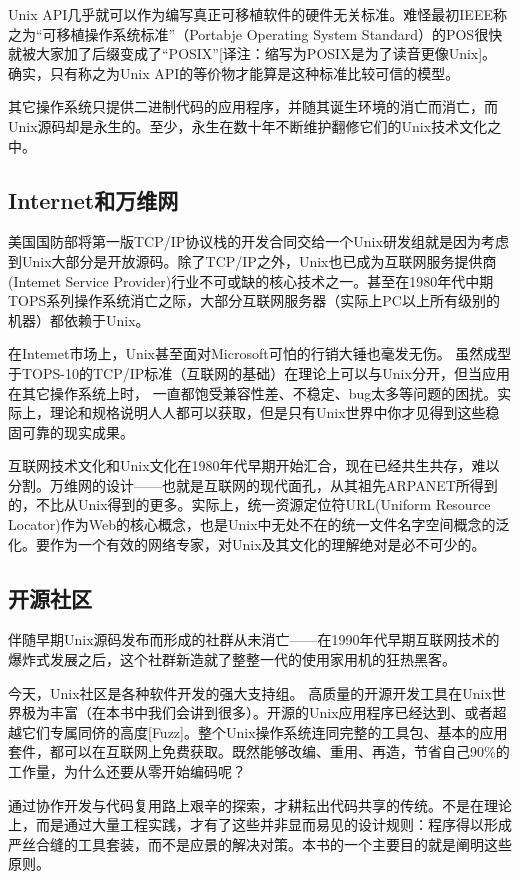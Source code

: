 \documentclass[12pt,oneside]{book}
\begin{document}
\begin{common-format}
Unix API几乎就可以作为编写真正可移植软件的硬件无关标准。难怪最初IEEE称之为“可移植操作系统标准”（Portabje Operating System Standard）的POS很快就被大家加了后缀变成了“POSIX”[译注：缩写为POSIX是为了读音更像Unix]。  确实，只有称之为Unix API的等价物才能算是这种标准比较可信的模型。

其它操作系统只提供二进制代码的应用程序，并随其诞生环境的消亡而消亡，而Unix源码却是永生的。至少，永生在数十年不断维护翻修它们的Unix技术文化之中。

\subsection{Internet和万维网}
美国国防部将第一版TCP/IP协议栈的开发合同交给一个Unix研发组就是因为考虑到Unix大部分是开放源码。除了TCP/IP之外，Unix也已成为互联网服务提供商(Intemet Service Provider)行业不可或缺的核心技术之一。甚至在1980年代中期TOPS系列操作系统消亡之际，大部分互联网服务器（实际上PC以上所有级别的机器）都依赖于Unix。

在Intemet市场上，Unix甚至面对Microsoft可怕的行销大锤也毫发无伤。  虽然成型于TOPS-10的TCP/IP标准（互联网的基础）在理论上可以与Unix分开，但当应用在其它操作系统上时，  一直都饱受兼容性差、不稳定、bug太多等问题的困扰。实际上，理论和规格说明人人都可以获取，但是只有Unix世界中你才见得到这些稳固可靠的现实成果。

互联网技术文化和Unix文化在1980年代早期开始汇合，现在已经共生共存，难以分割。万维网的设计——也就是互联网的现代面孔，从其祖先ARPANET所得到的，不比从Unix得到的更多。实际上，统一资源定位符URL(Uniform Resource Locator)作为Web的核心概念，也是Unix中无处不在的统一文件名字空间概念的泛化。要作为一个有效的网络专家，对Unix及其文化的理解绝对是必不可少的。

\subsection{开源社区}
伴随早期Unix源码发布而形成的社群从未消亡——在1990年代早期互联网技术的爆炸式发展之后，这个社群新造就了整整一代的使用家用机的狂热黑客。

今天，Unix社区是各种软件开发的强大支持组。  高质量的开源开发工具在Unix世界极为丰富（在本书中我们会讲到很多）。开源的Unix应用程序已经达到、或者超越它们专属同侪的高度[Fuzz]。整个Unix操作系统连同完整的工具包、基本的应用套件，都可以在互联网上免费获取。既然能够改编、重用、再造，节省自己90\%的工作量，为什么还要从零开始编码呢？

通过协作开发与代码复用路上艰辛的探索，才耕耘出代码共享的传统。不是在理论上，而是通过大量工程实践，才有了这些并非显而易见的设计规则：程序得以形成严丝合缝的工具套装，而不是应景的解决对策。本书的一个主要目的就是阐明这些原则。


\end{common-format}
\end{document}
